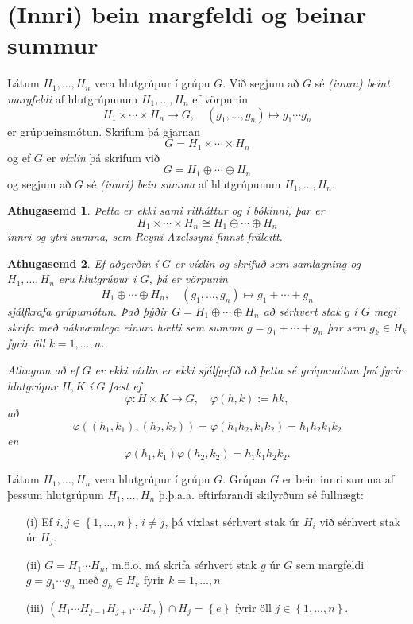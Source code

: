 \documentclass[a4paper,icelandic,11pt]{book}
\theoremstyle{plain}
\newtheorem*{ath}{Athugasemd}
\begin{document}
\section{(Innri) bein margfeldi og beinar summur}

\begin{skilgr}
  Látum $H_1,\dots,H_n$ vera hlutgrúpur í grúpu $G$. Við segjum að $G$ sé
  \emph{(innra) beint margfeldi}
  af hlutgrúpunum
  $H_1,\dots,H_n$ ef vörpunin
  \[
    H_1\times\cdots\times H_n\to G,
    \quad
    (g_1,\dots,g_n)\mapsto g_1\cdots g_n
  \]
  er grúpueinsmótun. Skrifum þá gjarnan
  \[
    G = H_1\times \cdots \times H_n
  \]
  og ef $G$ er \emph{víxlin} þá skrifum við
  \[
    G = H_1\oplus \cdots \oplus H_n
  \]
  og segjum að $G$ sé \emph{(innri) bein summa}
  af hlutgrúpunum $H_1,\dots,H_n$.
\end{skilgr}
\begin{ath}
  Þetta er ekki sami ritháttur og í bókinni, þar er 
  \[
    H_1\times\cdots\times H_n \cong H_1\oplus\cdots \oplus H_n
  \]
  innri og ytri summa, sem Reyni Axelssyni finnst fráleitt.
\end{ath}
\begin{ath}
  Ef aðgerðin í $G$ er víxlin og skrifuð sem samlagning og $H_1,\dots,H_n$
  eru hlutgrúpur í $G$, þá er vörpunin
  \[
    H_1\oplus \cdots \oplus H_n,
    \quad
    (g_1,\dots,g_n) \mapsto g_1 + \cdots + g_n
  \]
  sjálfkrafa grúpumótun. Það þýðir $G=H_1 \oplus\cdots\oplus H_n$ að sérhvert
  stak $g$ í $G$ megi skrifa með \emph{nákvæmlega einum hætti} sem summu
  $g = g_1+\cdots + g_n$ þar sem $g_k\in H_k$ fyrir öll $k = 1,\dots,n$.
  
  Athugum að ef $G$ er ekki víxlin er ekki sjálfgefið að þetta sé grúpumótun
  því fyrir hlutgrúpur $H,K$ í $G$ fæst ef
  \[
    \varphi: H\times K \to G, 
    \quad
    \varphi(h,k) := hk,
  \]
  að 
  \[
    \varphi((h_1,k_1),(h_2,k_2))
    = \varphi(h_1h_2, k_1k_2)
    = h_1h_2k_1k_2
  \]
  en
  \[
    \varphi(h_1,k_1)\varphi(h_2,k_2) = h_1k_1h_2k_2.
  \]
\end{ath}
\begin{setn}
  Látum $H_1,\dots,H_n$ vera hlutgrúpur í grúpu $G$. Grúpan $G$ er bein innri
  summa af þessum hlutgrúpum $H_1,\dots,H_n$ þ.þ.a.a. eftirfarandi skilyrðum
  sé fullnægt:
  \begin{itemize}
    \item [(i)] Ef $i,j\in \left\{ 1,\dots,n \right\}$, $i\neq j$, þá víxlast
    sérhvert stak úr $H_i$ við sérhvert stak úr $H_j$.
    \item [(ii)] $G = H_1\cdots H_n$, m.ö.o. má skrifa sérhvert stak $g$ úr $G$
    sem margfeldi $g = g_1\cdots g_n$ með $g_k\in H_k$ fyrir $k=1,\dots,n$.
    \item [(iii)] $(H_1\cdots H_{j-1}H_{j+1}\cdots H_n)\cap H_j = \left\{ e
    \right\}$ fyrir öll $j\in \left\{ 1,\dots,n \right\}$.
    
  \end{itemize}
\end{setn}
\end{document}
